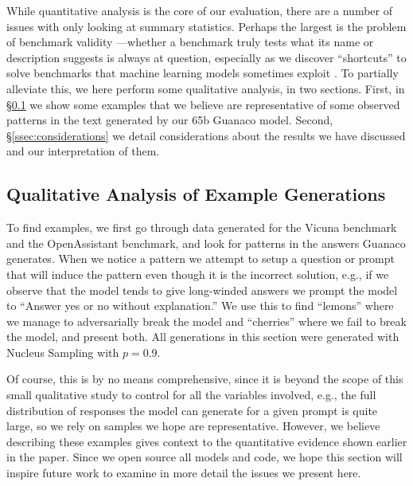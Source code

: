 \documentclass{article}
\newcommand{\model}{{Guanaco}\xspace}
\newcommand{\benchv}{the Vicuna benchmark\xspace}
\newcommand{\benchoa}{the OpenAssistant benchmark\xspace}
\begin{document}
While quantitative analysis is the core of our evaluation, there are a number of issues with only looking at summary statistics. Perhaps the largest is the problem of benchmark validity \citep{liao2021we}—whether a benchmark truly tests what its name or description suggests is always at question, especially as we discover ``shortcuts'' to solve benchmarks that machine learning models sometimes exploit \citep{gururangan2018annotation, poliak2018hypothesis}. To partially alleviate this, we here perform some qualitative analysis, in two sections. First, in \S\ref{ssec:examples} we show some examples that we believe are representative of some observed patterns in the text generated by our 65b \model model. Second, \S\ref{ssec:considerations} we detail considerations about the results we have discussed and our interpretation of them.

\subsection{Qualitative Analysis of Example Generations}
\label{ssec:examples}

To find examples, we first go through data generated for \benchv and \benchoa, and look for patterns in the answers \model generates. When we notice a pattern we attempt to setup a question or prompt that will induce the pattern even though it is the incorrect solution, e.g., if we observe that the model tends to give long-winded answers we prompt the model to ``Answer yes or no without explanation.'' We use this to find ``lemons'' where we manage to adversarially break the model and ``cherries'' where we fail to break the model, and present both. All generations in this section were generated with Nucleus Sampling \cite{holtzmancurious} with $p=0.9$.

Of course, this is by no means comprehensive, since it is beyond the scope of this small qualitative study to control for all the variables involved, e.g., the full distribution of responses the model can generate for a given prompt is quite large, so we rely on samples we hope are representative. However, we believe describing these examples gives context to the quantitative evidence shown earlier in the paper. Since we open source all models and code, we hope this section will inspire future work to examine in more detail the issues we present here.
\end{document}
